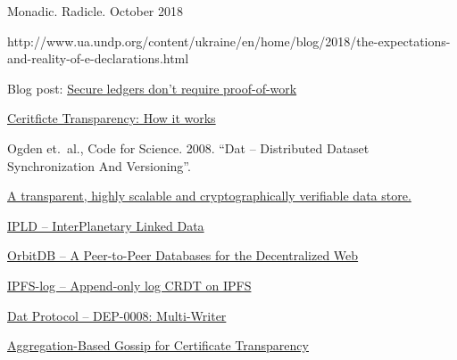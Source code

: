 \documentclass[a4paper, oneside, 10pt]{amsart}
\begin{document}
\begin{thebibliography}{9}

 Monadic. Radicle. October 2018

  http://www.ua.undp.org/content/ukraine/en/home/blog/2018/the-expectations-and-reality-of-e-declarations.html

 Blog post:
  \href{https://pfrazee.github.io/blog/secure-ledgers-dont-require-proof-of-work}{Secure
    ledgers don't require proof-of-work}

  \href{https://www.certificate-transparency.org/how-ct-works}{Ceritficte Transparency: How it works}

  Ogden et.~al., Code for Science. 2008. ``Dat -- Distributed Dataset Synchronization And Versioning''.

  \href{https://github.com/google/trillian}{A transparent, highly scalable and cryptographically verifiable data store.}

  \href{https://github.com/ipld/ipld}{IPLD -- InterPlanetary Linked Data}

  \href{https://github.com/orbitdb/orbit-db}{OrbitDB -- A Peer-to-Peer Databases for the Decentralized Web}

  \href{https://github.com/orbitdb/ipfs-log}{IPFS-log -- Append-only log CRDT on IPFS}

  \href{https://www.datprotocol.com/deps/0008-multiwriter/}{Dat Protocol -- DEP-0008: Multi-Writer}

  \href{https://arxiv.org/pdf/1806.08817.pdf}{Aggregation-Based Gossip for Certificate Transparency}
  
\end{thebibliography}
\end{document}
